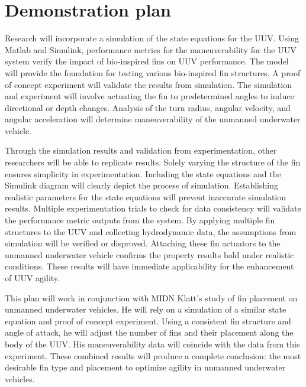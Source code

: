 \documentclass{IEEEtran}
\begin{document}
\section{Demonstration plan}
Research will incorporate a simulation of the state equations for the UUV.  Using Matlab and Simulink, performance metrics for the maneuverability for the UUV system verify the impact of bio-inspired fins on UUV performance. The model will provide the foundation for testing various bio-inspired fin structures.  A proof of concept experiment will validate the results from simulation.  The simulation and experiment will involve actuating the fin to predetermined angles to induce directional or depth changes.  Analysis of the turn radius, angular velocity, and angular acceleration will determine maneuverability of the unmanned underwater vehicle.  

Through the simulation results and validation from experimentation, other researchers will be able to replicate results.  Solely varying the structure of the fin ensures simplicity in experimentation.  Including the state equations and the Simulink diagram will clearly depict the process of simulation.  Establishing realistic parameters for the state equations will prevent inaccurate simulation results.  Multiple experimentation trials to check for data consistency will validate the performance metric outputs from the system.  By applying multiple fin structures to the UUV and collecting hydrodynamic data, the assumptions from simulation will be verified or disproved.  Attaching these fin actuators to the unmanned underwater vehicle confirms the property results hold under realistic conditions.  These results will have immediate applicability for the enhancement of UUV agility.  

This plan will work in conjunction with MIDN Klatt’s study of fin placement on unmanned underwater vehicles.  He will rely on a simulation of a similar state equation and proof of concept experiment.  Using a consistent fin structure and angle of attack, he will adjust the number of fins and their placement along the body of the UUV.  His maneuverability data will coincide with the data from this experiment.  These combined results will produce a complete conclusion: the most desirable fin type and placement to optimize agility in unmanned underwater vehicles.
\end{document}
